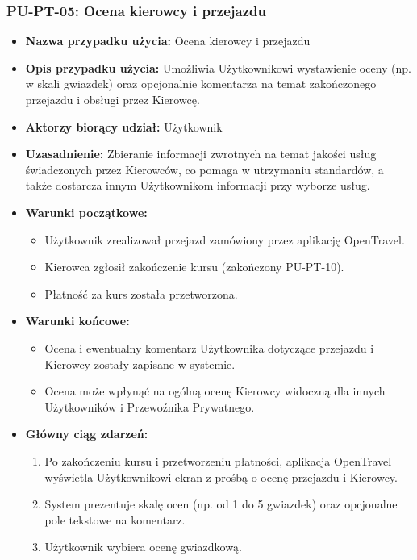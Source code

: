 \documentclass[a4paper,12pt]{article}
\begin{document}
\subsubsection{PU-PT-05: Ocena kierowcy i przejazdu}
\begin{itemize}
    \item \textbf{Nazwa przypadku użycia:} Ocena kierowcy i przejazdu
    \item \textbf{Opis przypadku użycia:} Umożliwia Użytkownikowi wystawienie oceny (np. w skali gwiazdek) oraz opcjonalnie komentarza na temat zakończonego przejazdu i obsługi przez Kierowcę.
    \item \textbf{Aktorzy biorący udział:} Użytkownik
    \item \textbf{Uzasadnienie:} Zbieranie informacji zwrotnych na temat jakości usług świadczonych przez Kierowców, co pomaga w utrzymaniu standardów, a także dostarcza innym Użytkownikom informacji przy wyborze usług.
    \item \textbf{Warunki początkowe:}
        \begin{itemize}
            \item Użytkownik zrealizował przejazd zamówiony przez aplikację OpenTravel.
            \item Kierowca zgłosił zakończenie kursu (zakończony PU-PT-10).
            \item Płatność za kurs została przetworzona.
        \end{itemize}
    \item \textbf{Warunki końcowe:}
        \begin{itemize}
            \item Ocena i ewentualny komentarz Użytkownika dotyczące przejazdu i Kierowcy zostały zapisane w systemie.
            \item Ocena może wpłynąć na ogólną ocenę Kierowcy widoczną dla innych Użytkowników i Przewoźnika Prywatnego.
        \end{itemize}
    \item \textbf{Główny ciąg zdarzeń:}
        \begin{enumerate}
            \item Po zakończeniu kursu i przetworzeniu płatności, aplikacja OpenTravel wyświetla Użytkownikowi ekran z prośbą o ocenę przejazdu i Kierowcy.
            \item System prezentuje skalę ocen (np. od 1 do 5 gwiazdek) oraz opcjonalne pole tekstowe na komentarz.
            \item Użytkownik wybiera ocenę gwiazdkową.

\end{enumerate}
\end{itemize}
\end{document}
